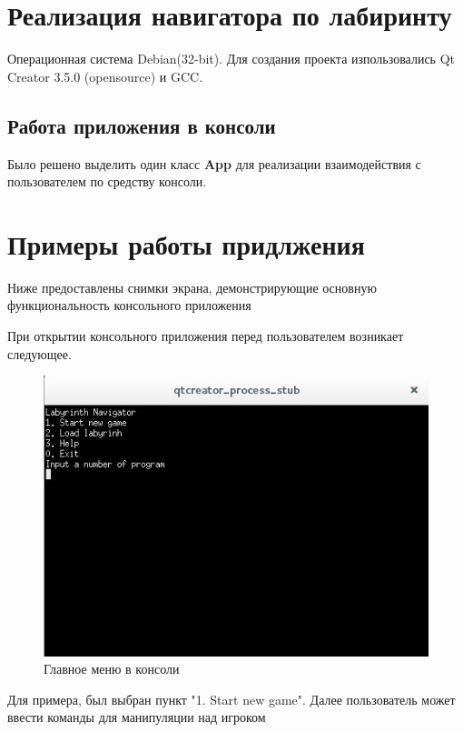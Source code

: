 \documentclass[a4paper]{article}
\begin{document}
\section{Реализация навигатора по лабиринту}
Операционная система Debian(32-bit). Для создания проекта изпользовались Qt Creator 3.5.0 (opensource) и GCC.

\subsection{Работа приложения в консоли}
	Было решено выделить один класс \textbf{App} для реализации взаимодействия с пользователем по средству консоли.
	
\section{Примеры работы придлжения}

Ниже предоставлены снимки экрана, демонстрирующие основную функциональность консольного приложения

При открытии консольного приложения перед пользователем возникает следующее. 

\begin{figure}[H]
	\begin{center}
		\includegraphics[scale=0.7]{Screenshot/1.jpg}
		\caption{Главное меню в консоли} 
		\label{pic:pic_name} %
	\end{center}
\end{figure}

Для примера, был выбран пункт "1. Start new game". Далее пользователь может ввести команды для манипуляции над игроком
\end{document}
